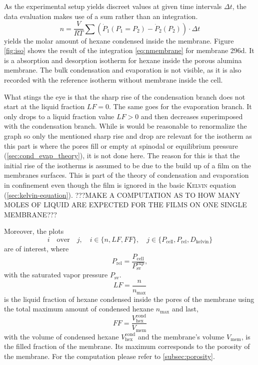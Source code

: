 \documentclass[../thesis.tex]{subfiles}
\begin{document}
        As the experimental setup yields discreet values at given time intervals $\Delta t$, the data evaluation makes use of a sum rather than an integration.
        \begin{equation}
            n = \frac{V}{RT} \sum \left( \dot{P}_1 ( P_1 = P_2) - \dot{P}_2(P_2) \right) \cdot \Delta t
            \label{eq:nmembrane}
        \end{equation}
        yields the molar amount of hexane condensed inside the membrane. Figure \cref{fig:iso} shows the result of the integration \cref{eq:nmembrane} for membrane 296d. It is a absorption and desorption isotherm for hexane inside the porous alumina membrane. The bulk condensation and evaporation is not visible, as it is also recorded with the reference isotherm without membrane inside the cell.

        What stings the eye is that the sharp rise of the condensation branch does not start at the liquid fraction $LF=0$. The same goes for the evaporation branch. It only drops to a liquid fraction value $LF>0$ and then decreases superimposed with the condensation branch. While is would be reasonable to renormalize the graph so only the mentioned sharp rise and drop are relevant for the isotherm as this part is where the pores fill or empty at spinodal or equilibrium pressure (\cref{sec:cond_evap_theory}), it is not done here. The reason for this is that the initial rise of the isotherms is assumed to be due to the build up of a film on the membranes surfaces. This is part of the theory of condensation and evaporation in confinement even though the film is ignored in the basic \textsc{Kelvin} equation (\cref{sec:kelvin-equation}). ???MAKE A COMPUTATION AS TO HOW MANY MOLES OF LIQUID ARE EXPECTED FOR THE FILMS ON ONE SINGLE MEMBRANE???
        \medskip

        Moreover, the plots
        \begin{equation}
            i \quad \mathrm{over} \quad j,\quad i\in \{n,LF,FF\}, \quad j\in \{P_\mathrm{cell},P_\mathrm{rel},D_\mathrm{kelvin}\}
        \end{equation}
        are of interest, where
        \begin{equation}
            P_\mathrm{rel} = \frac{P_\mathrm{cell}}{P_\mathrm{sv}^\mathrm{exp}},
        \end{equation}
        with the saturated vapor pressure $P_\mathrm{sv}$.
        \begin{equation}
            LF = \frac{n}{n_\mathrm{max}}
        \end{equation}
        is the liquid fraction of hexane condensed inside the pores of the membrane using the total maximum amount of condensed hexane $n_\mathrm{max}$ and last,
        \begin{equation}
            FF = \frac{V_\mathrm{hex}^\mathrm{cond}}{V_\mathrm{mem}}
        \end{equation}
        with the volume of condensed hexane $V_\mathrm{hex}^\mathrm{cond}$ and the membrane's volume $V_\mathrm{mem}$, is the filled fraction of the membrane. Its maximum corresponds to the porosity of the membrane. For the computation please refer to \cref{subsec:porosity}.
\end{document}
